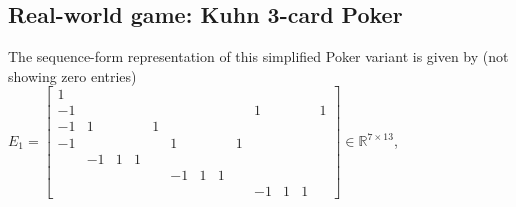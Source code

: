 \documentclass[12pt]{article}
\begin{document}
\subsection{Real-world game: Kuhn 3-card Poker}
The sequence-form representation of this simplified Poker variant \cite{kuhn} is given by (not showing zero entries)\\
$E_1 = \left[\begin{array}{ccccccccccccc}
1 &   &   &   &   &   &   &   &   &   &   &   &  \\
-1 &   &   &   &   &   &   &   &   & 1 &   &   & 1\\
-1 & 1 &   &   & 1 &   &   &   &   &   &   &   &  \\
-1 &   &   &   &   & 1 &   &   & 1 &   &   &   &  \\
  & -1 & 1 & 1 &   &   &   &   &   &   &   &   &  \\
  &   &   &   &   & -1 & 1 & 1 &   &   &   &   &  \\
  &   &   &   &   &   &   &   &   & -1 & 1 & 1 &  
\end{array}\right] \in \mathbb{R}^{7 \times 13}$,\\
\end{document}
